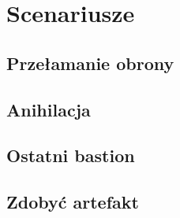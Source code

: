 \chapter{Scenariusze}

\section{Przełamanie obrony}
\label{sec:link_scenariusze_przelamanie_obrony} 
\section{Anihilacja}
\label{sec:link_scenariusze_anihilacja} 
\section{Ostatni bastion}
\label{sec:link_scenariusze_ostatni_bastion} 
\section{Zdobyć artefakt}
\label{sec:link_scenariusze_zdobyc_artefakt} 
